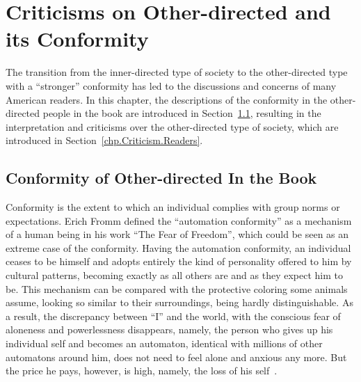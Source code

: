 \chapter{Criticisms on Other-directed and its Conformity}\label{chp.Criticism}

The transition from the inner-directed type of society to the other-directed type with a ``stronger'' conformity has led to the discussions and concerns of many American readers. In this chapter, the descriptions of the conformity in the other-directed people in the book are introduced in Section~\ref{chp.Criticism.Book}, resulting in the interpretation and criticisms over the other-directed type of society, which are introduced in Section~\ref{chp.Criticism.Readers}.

\section{Conformity of Other-directed In the Book}\label{chp.Criticism.Book}

Conformity is the extent to which an individual complies with group norms or expectations. Erich Fromm defined the ``automation conformity'' as a mechanism of a human being in his work ``The Fear of Freedom'', which could be seen as an extreme case of the conformity. Having the automation conformity, an individual ceases to be himself and adopts entirely the kind of personality offered to him by cultural patterns, becoming exactly as all others are and as they expect him to be. This mechanism can be compared with the protective coloring some animals assume, looking so similar to their surroundings, being hardly distinguishable. As a result, the discrepancy between ``I'' and the world, with the conscious fear of aloneness and powerlessness disappears, namely, the person who gives up his individual self and becomes an automaton, identical with millions of other automatons around him, does not need to feel alone and anxious any more. But the price he pays, however, is high, namely, the loss of his self~\citep{fromm1941fear}.

